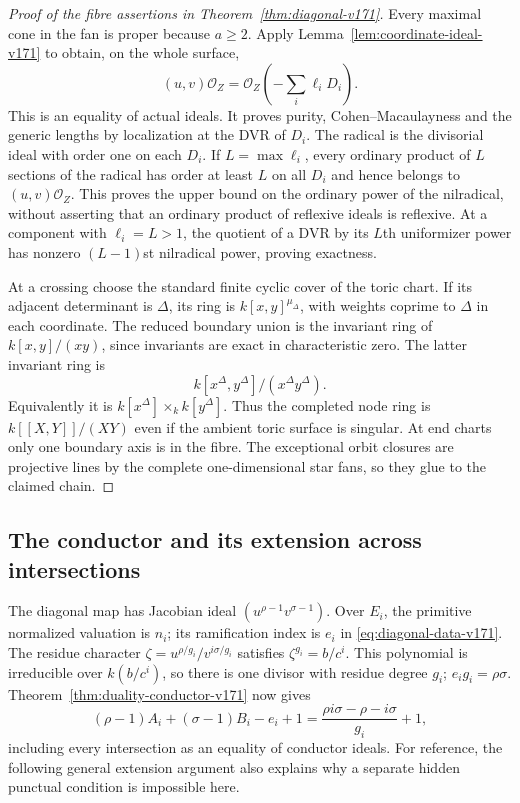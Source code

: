 \documentclass[11pt,reqno]{amsart}
\numberwithin{equation}{section}
\theoremstyle{definition}\newtheorem{definition}[theorem]{Definition}
\theoremstyle{remark}\newtheorem{remark}[theorem]{Remark}
\newcommand{\OO}{\mathcal O}\newcommand{\II}{\mathcal I}
\begin{document}
\begin{proof}[Proof of the fibre assertions in Theorem~\ref{thm:diagonal-v171}]
Every maximal cone in the fan is proper because $a\geq2$. Apply
Lemma~\ref{lem:coordinate-ideal-v171} to obtain, on the whole surface,
\[
 (u,v)\OO_Z=\OO_Z\left(-\sum_i\ell_iD_i\right).
\]
This is an equality of actual ideals. It proves purity,
Cohen--Macaulayness and the generic lengths by localization at the
DVR of $D_i$. The radical is the divisorial ideal with order one
on each $D_i$. If $L=\max\ell_i$, every ordinary product of $L$
sections of the radical has order at least $L$ on all $D_i$ and
hence belongs to $(u,v)\OO_Z$. This proves the upper bound on the
ordinary power of the nilradical, without asserting that an ordinary
product of reflexive ideals is reflexive. At a component with
$\ell_i=L>1$, the quotient of a DVR by its $L$th uniformizer power
has nonzero $(L-1)$st nilradical power, proving exactness.

At a crossing choose the standard finite cyclic cover of the toric
chart. If its adjacent determinant is $\Delta$, its ring is
$k[x,y]^{\mu_\Delta}$, with weights coprime to $\Delta$ in each
coordinate. The reduced boundary union is the invariant ring of
$k[x,y]/(xy)$, since invariants are exact in characteristic zero.
The latter invariant ring is
\[
 k[x^\Delta,y^\Delta]/(x^\Delta y^\Delta).
\]
Equivalently it is $k[x^\Delta]\times_k k[y^\Delta]$. Thus the
completed node ring is $k[[X,Y]]/(XY)$ even if the ambient toric
surface is singular. At end charts only one boundary axis is in the
fibre. The exceptional orbit closures are projective lines by the
complete one-dimensional star fans, so they glue to the claimed chain.
\end{proof}

\subsection{The conductor and its extension across intersections}
The diagonal map has Jacobian ideal
$(u^{\rho-1}v^{\sigma-1})$. Over $E_i$, the primitive normalized
valuation is $n_i$; its ramification index is $e_i$ in
\eqref{eq:diagonal-data-v171}. The residue character
$\zeta=u^{\rho/g_i}/v^{i\sigma/g_i}$ satisfies
$\zeta^{g_i}=b/c^i$. This polynomial is irreducible over
$k(b/c^i)$, so there is one divisor with residue degree $g_i$;
$e_i g_i=\rho\sigma$. Theorem~\ref{thm:duality-conductor-v171}
now gives
\[
 (\rho-1)A_i+(\sigma-1)B_i-e_i+1
 =\frac{\rho i\sigma-\rho-i\sigma}{g_i}+1,
\]
including every intersection as an equality of conductor ideals.
For reference, the following general extension argument also explains
why a separate hidden punctual condition is impossible here.
\end{document}
